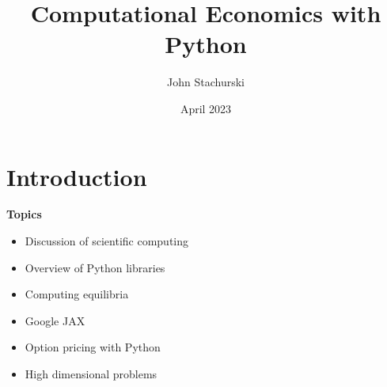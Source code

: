 \documentclass[
    xcolor={svgnames,dvipsnames},
    hyperref={colorlinks, citecolor=DeepPink4, linkcolor=DarkRed, urlcolor=DarkBlue}
    ]{beamer}  %
\title{Computational Economics with Python}
\author{John Stachurski}
\date{April 2023}
\newcommand{\1}{\mathbbm 1}
\begin{document}
\begin{frame}
  \titlepage
\end{frame}





\section{Introduction}



\begin{frame}


    \textbf{Topics}

    \begin{itemize}
        \item Discussion of scientific computing
        \vspace{0.5em}
        \item Overview of Python libraries
        \vspace{0.5em}
        \item Computing equilibria
        \vspace{0.5em}
        \item Google JAX
        \vspace{0.5em}
        \item Option pricing with Python
        \vspace{0.5em}
        \item High dimensional problems
    \end{itemize}

\end{frame}
\end{document}
